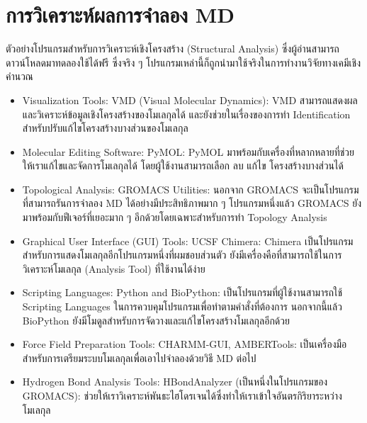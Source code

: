 \section{การวิเคราะห์ผลการจำลอง MD}

ตัวอย่างโปรแกรมสำหรับการวิเคราะห์เชิงโครงสร้าง (Structural Analysis) ซึ่งผู้อ่านสามารถดาวน์โหลดมาทดลองใช้ได้ฟรี ซึ่งจริง ๆ โปรแกรมเหล่านี้ก็ถูกนำมาใช้จริงในการทำงานวิจัยทางเคมีเชิงคำนวณ

\begin{itemize}[topsep=0pt,noitemsep]
    \setlength\itemsep{0.5em}
    \item Visualization Tools: VMD (Visual Molecular Dynamics): VMD สามารถแสดงผลและวิเคราะห์ข้อมูลเชิงโครงสร้างของโมเลกุลได้ และยังช่วยในเรื่องของการทำ Identification สำหรับปรับแก้ไขโครงสร้างบางส่วนของโมเลกุล

    \item Molecular Editing Software: PyMOL: PyMOL มาพร้อมกับเครื่องที่หลากหลายที่ช่วยให้เราแก้ไขและจัดการโมเลกุลได้ โดยผู้ใช้งานสามารถเลือก ลบ แก้ไข โครงสร้างบางส่วนได้

    \item Topological Analysis: GROMACS Utilities: นอกจาก GROMACS จะเป็นโปรแกรมที่สามารถรันการจำลอง MD ได้อย่างมีประสิทธิภาพมาก ๆ โปรแกรมหนึ่งแล้ว GROMACS ยังมาพร้อมกับฟีเจอร์ที่เยอะมาก ๆ อีกด้วยโดยเฉพาะสำหรับการทำ Topology Analysis

    \item Graphical User Interface (GUI) Tools: UCSF Chimera: Chimera เป็นโปรแกรมสำหรับการแสดงโมเลกุลอีกโปรแกรมหนึ่งที่ผมชอบส่วนตัว ยังมีเครื่องคือที่สามารถใช้ในการวิเคราะห์โมเลกุล (Analysis Tool) ที่ใช้งานได้ง่าย

    \item Scripting Languages: Python and BioPython: เป็นโปรแกรมที่ผู้ใช้งานสามารถใช้ Scripting Languages ในการควบคุมโปรแกรมเพื่อทำตามคำสั่งที่ต้องการ นอกจากนี้แล้ว BioPython ยังมีโมดูลสำหรับการจัดวางและแก้ไขโครงสร้างโมเลกุลอีกด้วย

    \item Force Field Preparation Tools: CHARMM-GUI, AMBERTools: เป็นเครื่องมือสำหรับการเตรียมระบบโมเลกุลเพื่อเอาไปจำลองด้วยวิธี MD ต่อไป

    \item Hydrogen Bond Analysis Tools: HBondAnalyzer (เป็นหนึ่งในโปรแกรมของ GROMACS): ช่วยให้เราวิเคราะห์พันธะไฮโดรเจนได้ซึ่งทำให้เราเข้าใจอันตรกิริยาระหว่างโมเลกุล
\end{itemize}

